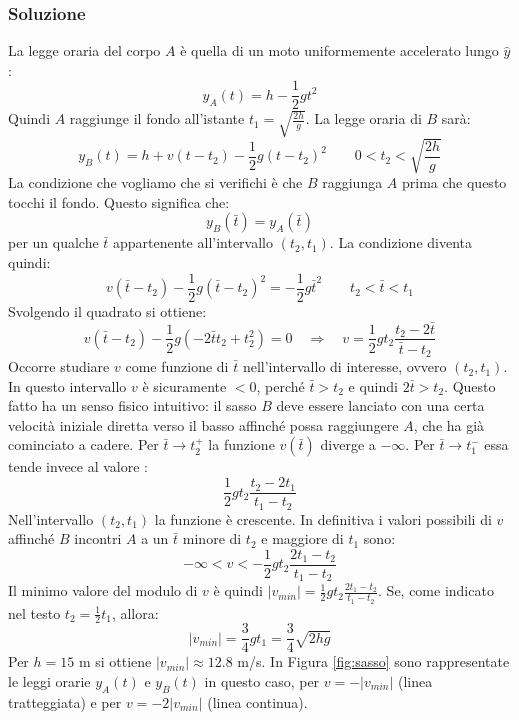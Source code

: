 \documentclass[12pt,a4paper]{book}
\begin{document}
\subsubsection*{Soluzione}
La legge oraria del corpo $A$ è quella di un moto uniformemente accelerato lungo $\hat{y}$:
%
\begin{equation*}
y_A(t)=h- \frac{1}{2}g t^2
\end{equation*}
%
Quindi $A$ raggiunge il fondo all'istante $t_1= \sqrt{\frac{2h}{g}}$. 
La legge oraria di $B$ sarà:
%
\begin{equation*}
y_B(t)=h + v(t-t_2)- \frac{1}{2}g (t-t_2)^2 \qquad 0<t_2<\sqrt{\frac{2h}{g}}
\end{equation*}
%
La condizione che vogliamo che si verifichi è che $B$ raggiunga $A$ prima che questo tocchi il fondo. Questo significa che:
%
\begin{equation*}
y_B(\bar{t})=y_A(\bar{t}) 
\end{equation*}
%
per un qualche $\bar{t}$ appartenente all'intervallo $(t_2, t_1)$. La condizione diventa quindi:
%
\begin{equation*}
v(\bar{t}-t_2)- \frac{1}{2}g (\bar{t}-t_2)^2= - \frac{1}{2}g \bar{t}^2 \qquad t_2 < \bar{t} <t_1
\end{equation*}
%
Svolgendo il quadrato si ottiene:
%
\begin{equation*}
v(\bar{t}-t_2)- \frac{1}{2}g (-2\bar{t}t_2 + t_2^2)=0 \quad \Rightarrow \quad v=\frac{1}{2}g t_2\frac{t_2-2\bar{t}}{\bar{t}-t_2}
\end{equation*}
%
Occorre studiare $v$ come funzione di $\bar{t}$ nell'intervallo di interesse, ovvero $(t_2, t_1)$. In questo intervallo $v$ è sicuramente $<0$, perché  $\bar{t}>t_2$ e quindi $2\bar{t}>t_2$. Questo fatto ha un senso fisico intuitivo: il sasso $B$ deve essere lanciato con una certa velocità iniziale diretta verso il basso affinché possa raggiungere $A$, che ha già cominciato a cadere.  Per $\bar{t}\rightarrow t_2^+$ la funzione $v(\bar{t})$ diverge a $-\infty$. Per $\bar{t}\rightarrow t_1^-$ essa tende invece al valore :
%
\begin{equation*}
\frac{1}{2}g t_2\frac{t_2-2t_1}{t_1-t_2}
\end{equation*}
%
Nell'intervallo $(t_2, t_1)$ la funzione è crescente. In definitiva i valori
possibili di $v$ affinché $B$ incontri $A$ a un $\bar{t}$ minore di $t_2$ e maggiore di $t_1$ sono:
%
\begin{equation*}
-\infty < v < - \frac{1}{2}g t_2\frac{2t_1-t_2}{t_1-t_2}
\end{equation*}
%
Il minimo valore del modulo di $v$ è quindi $|v_{min}|=\frac{1}{2}g t_2\frac{2t_1-t_2}{t_1-t_2}$. Se, come indicato nel testo $t_2=\frac{1}{2}t_1$, allora: 
%
\begin{equation*}
|v_{min}|=\frac{3}{4}g t_1= \frac{3}{4}\sqrt{2hg}
\end{equation*}
%
Per $h=15$ m si ottiene $|v_{min}| \approx 12.8$ m/s. In Figura  \ref{fig:sasso} sono rappresentate le leggi orarie $y_A(t)$ e $y_B(t)$ in questo caso, per $v=-|v_{min}|$ (linea tratteggiata) e per $v=-2|v_{min}|$ (linea continua).
\end{document}
